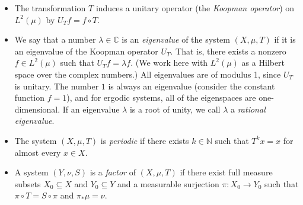 \documentclass{amsart}
\theoremstyle{definition}
\numberwithin{equation}{section}
\newcommand{\N}{\mathbb{N}}
\newcommand{\C}{\mathbb{C}}
\begin{document}
\begin{itemize}
    \item The transformation $T$ induces a unitary operator (the \emph{Koopman operator}) on $L^2(\mu)$ by $U_Tf = f \circ T$.
    \item We say that a number $\lambda \in \C$ is an \emph{eigenvalue} of the system $(X, \mu, T)$ if it is an eigenvalue of the Koopman operator $U_T$.
    That is, there exists a nonzero $f \in L^2(\mu)$ such that $U_Tf = \lambda f$.
    (We work here with $L^2(\mu)$ as a Hilbert space over the complex numbers.)
    All eigenvalues are of modulus 1, since $U_T$ is unitary.
    The number $1$ is always an eigenvalue (consider the constant function $f = 1$), and for ergodic systems, all of the eigenspaces are one-dimensional.
    If an eigenvalue $\lambda$ is a root of unity, we call $\lambda$ a \emph{rational eigenvalue}.
    \item The system $(X, \mu, T)$ is \emph{periodic} if there exists $k \in \N$ such that $T^kx = x$ for almost every $x \in X$.
    \item A system $(Y, \nu, S)$ is a \emph{factor} of $(X, \mu, T)$ if there exist full measure subsets $X_0 \subseteq X$ and $Y_0 \subseteq Y$ and a measurable surjection $\pi : X_0 \to Y_0$ such that $\pi \circ T = S \circ \pi$ and $\pi_*\mu = \nu$.
\end{itemize}
\end{document}
